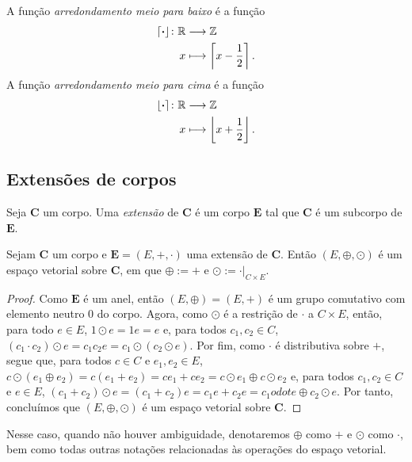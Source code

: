 \begin{definition}
A função \emph{arredondamento meio para baixo} é a função
	\begin{align*}
	{\left\lceil{\bm{\cdot}}\right\rfloor}\colon {\mathbb{R}} &\longrightarrow {\mathbb{Z}} \\{x} &\longmapsto \left\lceil{x-\frac{1}{2}}\right\rceil.
	\end{align*}
A função \emph{arredondamento meio para cima} é a função
	\begin{align*}
	{\left\lfloor{\bm{\cdot}}\right\rceil}\colon {\mathbb{R}} &\longrightarrow {\mathbb{Z}} \\{x} &\longmapsto \left\lfloor{x+\frac{1}{2}}\right\rfloor.
	\end{align*}
\end{definition}




\subsection{Extensões de corpos}

\begin{definition}
	Seja $\bm C$ um corpo. Uma \emph{extensão} de $\bm C$ é um corpo $\bm E$ tal que $\bm C$ é um subcorpo de $\bm E$.
\end{definition}

\begin{proposition}
	Sejam $\bm C$ um corpo e $\bm E = (E,+,\cdot)$ uma extensão de $\bm C$. Então $(E,\oplus,\odot)$ é um espaço vetorial sobre $\bm C$, em que $\oplus := +$ e $\odot := \cdot|_{C \times E}$.
\end{proposition}
\begin{proof}
	Como $\bm E$ é um anel, então $(E,\oplus)=(E,+)$ é um grupo comutativo com elemento neutro $0$ do corpo. Agora, como $\odot$ é a restrição de $\cdot$ a $C \times E$, então, para todo $e \in E$, $1 \odot e = 1e = e$ e, para todos $c_1,c_2 \in C$, $(c_1 \cdot c_2) \odot e = c_1c_2e = c_1 \odot (c_2 \odot e)$. Por fim, como $\cdot$ é distributiva sobre $+$, segue que, para todos $c \in C$ e $e_1,e_2 \in E$, $c \odot (e_1 \oplus e_2) = c(e_1+e_2) = ce_1+ce_2 = c \odot e_1 \oplus c \odot e_2$ e, para todos $c_1,c_2 \in C$ e $e \in E$, $(c_1+c_2) \odot e = (c_1+c_2)e = c_1e+c_2e = c_1 odot e \oplus c_2 \odot e$. Por tanto, concluímos que $(E,\oplus,\odot)$ é um espaço vetorial sobre $\bm C$.
\end{proof}

\begin{notation}
	Nesse caso, quando não houver ambiguidade, denotaremos $\oplus$ como $+$ e $\odot$ como $\cdot$, bem como todas outras notações relacionadas às operações do espaço vetorial.
\end{notation}

